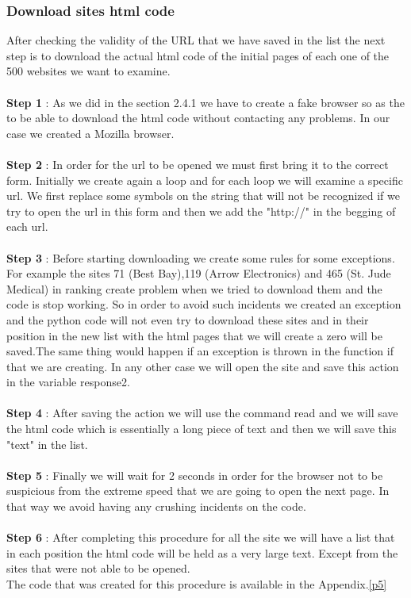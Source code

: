 \documentclass{article}
\begin{document}
\subsubsection{Download sites html code}
After checking the validity of the URL that we have saved in the list the next step is to download the actual html code of the initial pages of each one of the 500 websites we want to examine.\\\\
\textbf{Step 1} : As we did in the section 2.4.1 we have to create a fake browser so as the to be able to download the html code without contacting any problems. In our case we created a Mozilla browser.\\\\
\textbf{Step 2} : In order for the url to be opened we must first bring it to the correct form. Initially we create again a loop and for each loop we will examine a specific url. We first replace some symbols on the string that will not be recognized if we try to open the url in this form and then we add the "http://" in the begging of each url.\\ \\
\textbf{Step 3} : Before starting downloading we create some rules for some exceptions. For example the sites 71 (Best Bay),119 (Arrow Electronics) and 465 (St. Jude Medical) in ranking create problem when we tried to download them and the code is stop working. So in order to avoid such incidents we created an exception and the python code will not even try to download these sites and in their position in the new list with the html pages that we will create a zero will be saved.The same thing would happen if an exception is thrown in the function if that we are creating. In any other case we will open the site and save this action in the variable response2.\\\\
\textbf{Step 4} : After saving the action we will use the command read and we will save the html code which is essentially a long piece of text and then we will save this "text" in the list.\\\\
\textbf{Step 5} : Finally we will wait for 2 seconds in order for the browser not to be suspicious from the extreme speed that we are going to open the next page. In that way we avoid having any crushing incidents on the code.\\\\
\textbf{Step 6} : After completing this procedure for all the site we will have a list that in each position the html code will be held as a very large text. Except from the sites that were not able to be opened.\\
The code that was created for this procedure is available in the Appendix.\ref{p5}
\end{document}
